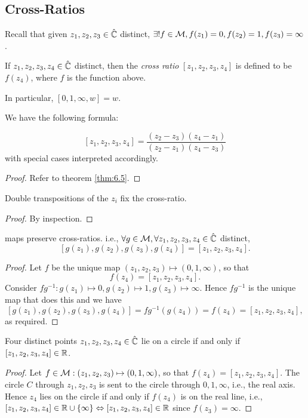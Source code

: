 \documentclass[10pt]{article}
\begin{document}
    \subsection{Cross-Ratios}
    Recall that given $z_1,z_2,z_3 \in \hat{{\mathbb{C}}}$ distinct, $ \exists !f\in {\mathcal{M}}, f(z_1)=0, f(z_2)=1,f(z_3)=\infty  $. 
    \begin{definition}
        If $z_1,z_2,z_3,z_4 \in \hat{{\mathbb{C}}}$ distinct, then the \textit{cross ratio} $ [z_1,z_2,z_3,z_4] $ is defined to be $f(z_4)$, where $f$ is the function above.

        In particular, $ [0,1,\infty,w]=w $.
    \end{definition}
    We have the following formula:
    \begin{proposition}
        \[
            [z_1,z_2,z_3,z_4] = \frac{(z_2-z_3)(z_4-z_1)}{(z_2-z_1)(z_4-z_3)}
        \]
        with special cases interpreted accordingly.
    \end{proposition}
    \begin{proof}
        Refer to theorem \ref{thm:6.5}.
    \end{proof}
    \begin{proposition}\label{prop:6.10}
        Double transpositions of the $z_i$ fix the cross-ratio.
    \end{proposition}
    \begin{proof}
        By inspection.
    \end{proof}
    \begin{theorem}\label{thm:6.11}
        \mobius maps preserve cross-ratios. i.e., $ \forall g\in {\mathcal{M}}, \forall z_1,z_2,z_3,z_4\in \hat{{\mathbb{C}}} $ distinct,
        \[
            [g(z_1),g(z_2),g(z_3),g(z_4)]=[z_1,z_2,z_3,z_4].
        \] 
    \end{theorem}
    \begin{proof}
        Let $f$ be the unique \mobius map $ (z_1,z_2,z_3)\mapsto (0,1,\infty ) $, so that 
        \[
            f(z_4)=[z_1,z_2,z_3,z_4].
        \]
        Consider $ fg^{-1}: g(z_1)\mapsto 0,g(z_2)\mapsto 1,g(z_3)\mapsto \infty  $. Hence $fg^{-1}$ is the unique map that does this and we have 
        \[
            [g(z_1),g(z_2),g(z_3),g(z_4)] = fg^{-1}(g(z_4))=f(z_4)=[z_1,z_2,z_3,z_4],
        \]
        as required.
    \end{proof}
    \begin{corollary}\label{col:6.12}
        Four distinct points $z_1,z_2,z_3,z_4\in \hat{{\mathbb{C}}}$ lie on a circle if and only if $[z_1,z_2,z_3,z_4]\in {\mathbb{R}}$.
    \end{corollary}
    \begin{proof}
        Let $f\in {\mathcal{M}}: (z_1,z_2,z_3)\mapsto (0,1,\infty )$, so that $ f(z_4)=[z_1,z_2,z_3,z_4] $. The circle $C$ through $z_1,z_2,z_3$ is sent to the circle through $0,1,\infty$, i.e., the real axis. Hence $z_4$ lies on the circle if and only if $f(z_4)$ is on the real line, i.e., $[z_1,z_2,z_3,z_4]\in {\mathbb{R}} \cup \{\infty\} \Leftrightarrow [z_1,z_2,z_3,z_4]\in {\mathbb{R}}$ since $f(z_3)=\infty$.
    \end{proof}
\end{document}
